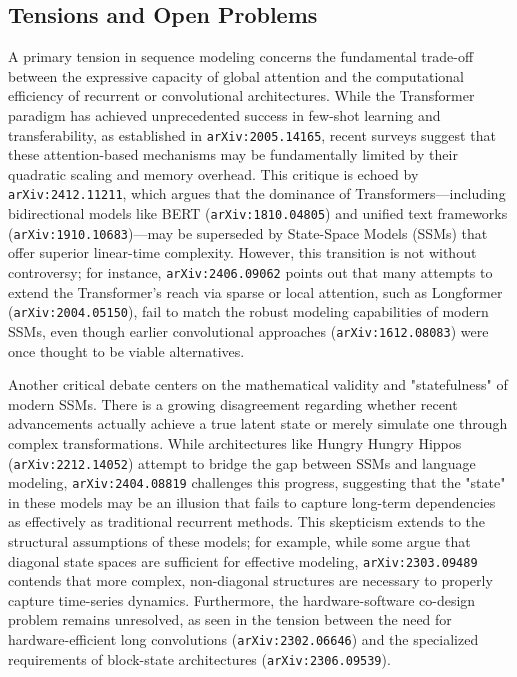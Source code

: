 \documentclass[11pt]{article}
\begin{document}
\subsection{Tensions and Open Problems}

A primary tension in sequence modeling concerns the fundamental trade-off between the expressive capacity of global attention and the computational efficiency of recurrent or convolutional architectures. While the Transformer paradigm has achieved unprecedented success in few-shot learning and transferability, as established in \texttt{arXiv:2005.14165}, recent surveys suggest that these attention-based mechanisms may be fundamentally limited by their quadratic scaling and memory overhead. This critique is echoed by \texttt{arXiv:2412.11211}, which argues that the dominance of Transformers—including bidirectional models like BERT (\texttt{arXiv:1810.04805}) and unified text frameworks (\texttt{arXiv:1910.10683})—may be superseded by State-Space Models (SSMs) that offer superior linear-time complexity. However, this transition is not without controversy; for instance, \texttt{arXiv:2406.09062} points out that many attempts to extend the Transformer's reach via sparse or local attention, such as Longformer (\texttt{arXiv:2004.05150}), fail to match the robust modeling capabilities of modern SSMs, even though earlier convolutional approaches (\texttt{arXiv:1612.08083}) were once thought to be viable alternatives.

Another critical debate centers on the mathematical validity and "statefulness" of modern SSMs. There is a growing disagreement regarding whether recent advancements actually achieve a true latent state or merely simulate one through complex transformations. While architectures like Hungry Hungry Hippos (\texttt{arXiv:2212.14052}) attempt to bridge the gap between SSMs and language modeling, \texttt{arXiv:2404.08819} challenges this progress, suggesting that the "state" in these models may be an illusion that fails to capture long-term dependencies as effectively as traditional recurrent methods. This skepticism extends to the structural assumptions of these models; for example, while some argue that diagonal state spaces are sufficient for effective modeling, \texttt{arXiv:2303.09489} contends that more complex, non-diagonal structures are necessary to properly capture time-series dynamics. Furthermore, the hardware-software co-design problem remains unresolved, as seen in the tension between the need for hardware-efficient long convolutions (\texttt{arXiv:2302.06646}) and the specialized requirements of block-state architectures (\texttt{arXiv:2306.09539}).
\end{document}
